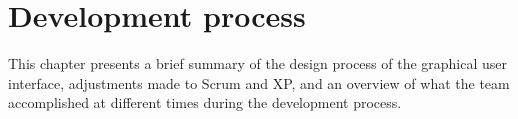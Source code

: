 \chapter{Development process}
\label{sec:devProcess}
This chapter presents a brief summary of the design process of the graphical user interface, adjustments made to Scrum and XP, and an overview of what the team accomplished at different times during the development process. 




